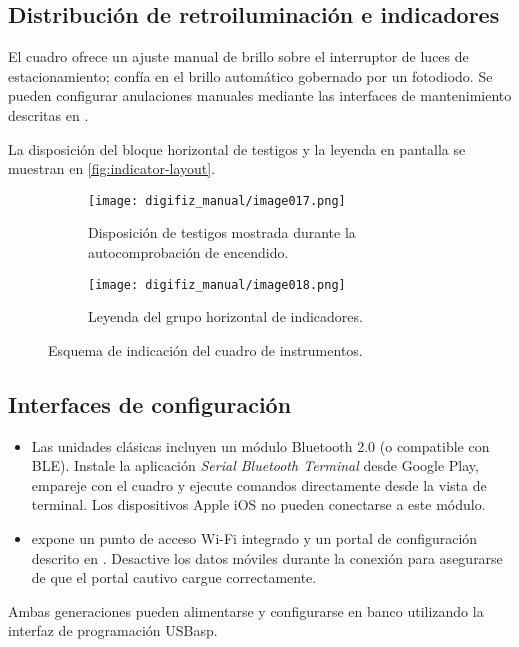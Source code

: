 \subsection{Distribución de retroiluminación e indicadores}
El cuadro \ReplicaGenOneShort{} ofrece un ajuste manual de brillo sobre el interruptor de luces de estacionamiento; \ReplicaNextShort{} confía en el brillo automático gobernado por un fotodiodo. Se pueden configurar anulaciones manuales mediante las interfaces de mantenimiento descritas en .

La disposición del bloque horizontal de testigos y la leyenda en pantalla se muestran en \autoref{fig:indicator-layout}.

\begin{figure}[htbp]
    \centering
    \begin{subfigure}{0.48\textwidth}
        \texttt{[image: digifiz\_manual/image017.png]}
        \caption{Disposición de testigos mostrada durante la autocomprobación de encendido.}
    \end{subfigure}\hfill
    \begin{subfigure}{0.48\textwidth}
        \texttt{[image: digifiz\_manual/image018.png]}
        \caption{Leyenda del grupo horizontal de indicadores.}
    \end{subfigure}
    \caption{Esquema de indicación del cuadro de instrumentos.}
    \label{fig:indicator-layout}
\end{figure}

\subsection{Interfaces de configuración}
\begin{itemize}
    \item Las unidades \ReplicaGenOne{} clásicas incluyen un módulo Bluetooth 2.0 (o compatible con BLE). Instale la aplicación \emph{Serial Bluetooth Terminal} desde Google Play, empareje con el cuadro y ejecute comandos directamente desde la vista de terminal. Los dispositivos Apple iOS no pueden conectarse a este módulo.
    \item \ReplicaNextShort{} expone un punto de acceso Wi-Fi integrado y un portal de configuración descrito en . Desactive los datos móviles durante la conexión para asegurarse de que el portal cautivo cargue correctamente.
\end{itemize}
Ambas generaciones pueden alimentarse y configurarse en banco utilizando la interfaz de programación USBasp.

